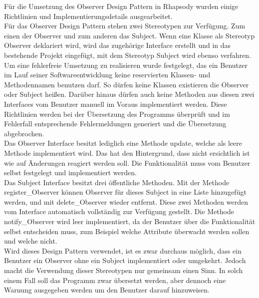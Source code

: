 Für die Umsetzung des Observer Design Pattern in Rhapsody wurden einige Richtlinien und 
Implementierungsdetails ausgearbeitet.\\
\newline
Für das Observer Design Pattern stehen zwei Stereotypen zur Verfügung. Zum einen der Observer 
und zum anderen das Subject. Wenn eine Klasse als Stereotyp Observer deklariert wird, wird das 
zugehörige Interface erstellt und in das bestehende Projekt eingefügt, mit dem Stereotyp Subject 
wird ebenso verfahren.\\
\newline
Um eine fehlerfreie Umsetzung zu realisieren wurde festgelegt, das ein Benutzer im Lauf seiner 
Softwareentwicklung keine reservierten Klassen- und Methodennamen benutzen darf. So dürfen 
keine Klassen existieren die Observer oder Subject heißen. Darüber hinaus dürfen auch keine 
Methoden aus diesen zwei Interfaces vom Benutzer manuell im Voraus implementiert werden. 
Diese Richtlinien werden bei der Übersetzung des Programms überprüft und im Fehlerfall 
entsprechende Fehlermeldungen generiert und die Übersetzung abgebrochen.\\
\newline
Das Observer Interface besitzt lediglich eine Methode update, welche als leere Methode 
implementiert wird. Das hat den Hintergrund, dass nicht ersichtlich ist wie auf Änderungen 
reagiert werden soll. Die Funktionalität muss vom Benutzer selbst festgelegt und implementiert 
werden.\\
\newline
Das Subject Interface besitzt drei öffentliche Methoden. Mit der Methode register_Observer 
können Observer für dieses Subject in eine Liste hinzugefügt werden, und mit delete_Observer 
wieder entfernt. Diese zwei Methoden werden vom Interface automatisch vollständig zur Verfügung
gestellt. Die Methode notify_Observer wird leer implementiert, da der Benutzer über die 
Funktionalität selbst entscheiden muss, zum Beispiel welche Attribute überwacht werden 
sollen und welche nicht.\\
\newline
Wird dieses Design Pattern verwendet, ist es zwar durchaus möglich, dass ein Benutzer ein 
Observer ohne ein Subject implementiert oder umgekehrt. Jedoch macht die Verwendung 
dieser Stereotypen nur gemeinsam einen Sinn. In solch einem Fall soll das Programm zwar 
übersetzt werden, aber dennoch eine Warnung ausgegeben werden um den Benutzer darauf hinzuweisen.

						